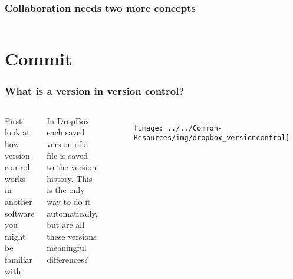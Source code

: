 \documentclass[aspectratio=169]{beamer} %
\begin{document}
\begin{frame}
\frametitle{Collaboration needs two more concepts}


	\vspace{1cm}

	\begin{columns}[c]



	\end{columns}

	\vspace{2cm}

\end{frame}

\section{Commit}

\begin{frame}
\frametitle{What is a version in version control?}

	\begin{columns}[c]

		\column{.50\textwidth}
		First look at how version control works in another software you might be familiar with.

		\vspace{.5cm}

		In DropBox each saved version of a file is saved to the version history. This is the only way to do it automatically, but are all these versions meaningful differences?

		\column{.50\textwidth}
		\begin{figure}
			\centering
			\texttt{[image: ../../Common-Resources/img/dropbox\_versioncontrol]}
			\label{fig:dropboxversioncontrol}
		\end{figure}

	\end{columns}


\end{frame}
\end{document}
